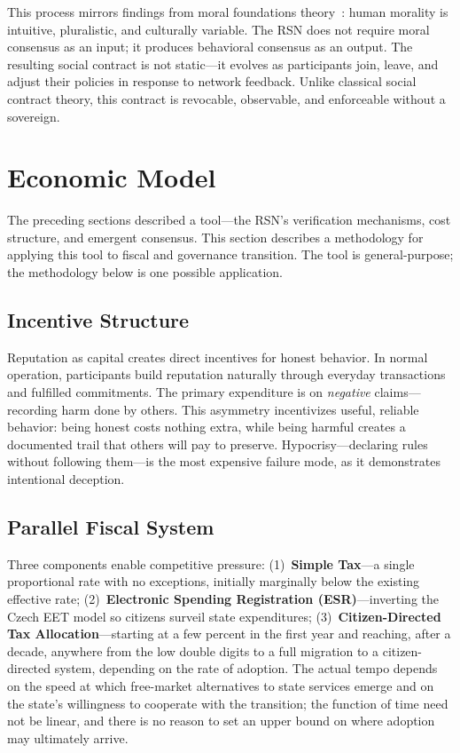 \documentclass[11pt,a4paper,twocolumn]{article}
\begin{document}
This process mirrors findings from moral foundations theory~\cite{haidt2012}: human morality is intuitive, pluralistic, and culturally variable. The RSN does not require moral consensus as an input; it produces behavioral consensus as an output. The resulting social contract is not static---it evolves as participants join, leave, and adjust their policies in response to network feedback. Unlike classical social contract theory, this contract is revocable, observable, and enforceable without a sovereign.

\section{Economic Model}

The preceding sections described a tool---the RSN's verification mechanisms, cost structure, and emergent consensus. This section describes a methodology for applying this tool to fiscal and governance transition. The tool is general-purpose; the methodology below is one possible application.

\subsection{Incentive Structure}

Reputation as capital creates direct incentives for honest behavior. In normal operation, participants build reputation naturally through everyday transactions and fulfilled commitments. The primary expenditure is on \emph{negative} claims---recording harm done by others. This asymmetry incentivizes useful, reliable behavior: being honest costs nothing extra, while being harmful creates a documented trail that others will pay to preserve. Hypocrisy---declaring rules without following them---is the most expensive failure mode, as it demonstrates intentional deception.

\subsection{Parallel Fiscal System}

Three components enable competitive pressure: (1)~\textbf{Simple Tax}---a single proportional rate with no exceptions, initially marginally below the existing effective rate; (2)~\textbf{Electronic Spending Registration (ESR)}---inverting the Czech EET model so citizens surveil state expenditures; (3)~\textbf{Citizen-Directed Tax Allocation}---starting at a few percent in the first year and reaching, after a decade, anywhere from the low double digits to a full migration to a citizen-directed system, depending on the rate of adoption. The actual tempo depends on the speed at which free-market alternatives to state services emerge and on the state's willingness to cooperate with the transition; the function of time need not be linear, and there is no reason to set an upper bound on where adoption may ultimately arrive.
\end{document}
